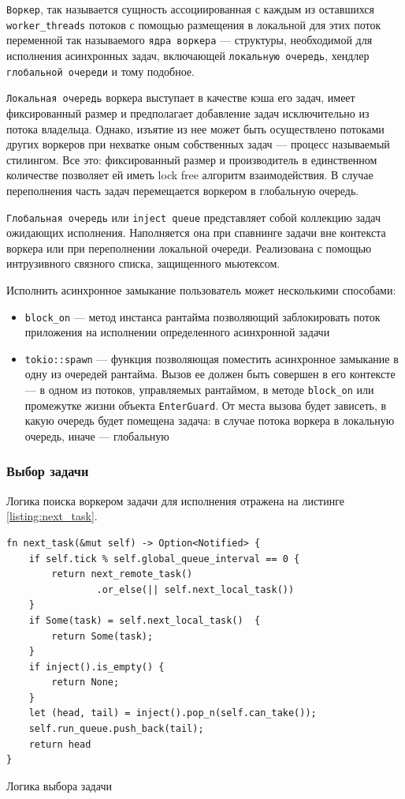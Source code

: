 \verb|Воркер|, так называется сущность ассоциированная с каждым из оставшихся \verb|worker_threads| потоков с помощью размещения в локальной для этих поток переменной так называемого \verb|ядра воркера| --- структуры, необходимой для исполнения асинхронных задач, включающей \verb|локальную очередь|, хендлер \verb|глобальной очереди| и тому подобное.

\verb|Локальная очередь| воркера выступает в качестве кэша его задач, имеет фиксированный размер и предполагает добавление задач исключительно из потока владельца. Однако, изъятие из нее может быть осуществлено потоками других воркеров при нехватке оным собственных задач --- процесс называемый стилингом. Все это: фиксированный размер и производитель в единственном количестве позволяет ей иметь lock free алгоритм взаимодействия. В случае переполнения часть задач перемещается воркером в глобальную очередь.

\verb|Глобальная очередь| или \verb|inject queue| представляет собой коллекцию задач ожидающих исполнения. Наполняется она при спавнинге задачи вне контекста воркера или при переполнении локальной очереди. Реализована с помощью интрузивного связного списка, защищенного мьютексом.

Исполнить асинхронное замыкание пользователь может несколькими способами:

\begin{itemize}
    \item \verb|block_on| --- метод инстанса рантайма позволяющий заблокировать поток приложения на исполнении определенного асинхронной задачи
    \item \verb|tokio::spawn| --- функция позволяющая поместить асинхронное замыкание в одну из очередей рантайма. Вызов ее должен быть совершен в его контексте --- в одном из потоков, управляемых рантаймом, в методе \verb|block_on| или промежутке жизни объекта \verb|EnterGuard|. От места вызова будет зависеть, в какую очередь будет помещена задача: в случае потока воркера в локальную очередь, иначе --- глобальную
\end{itemize}

\subsubsection{Выбор задачи}

Логика поиска воркером задачи для исполнения отражена на листинге \ref{listing:next_task}.

\begin{listing}[H]
    \begin{verbatim}
fn next_task(&mut self) -> Option<Notified> {
    if self.tick % self.global_queue_interval == 0 {
        return next_remote_task()
                .or_else(|| self.next_local_task())
    }
    if Some(task) = self.next_local_task()  {
        return Some(task);
    }
    if inject().is_empty() {
        return None;
    }
    let (head, tail) = inject().pop_n(self.can_take());
    self.run_queue.push_back(tail);
    return head
}
    \end{verbatim}

    \caption{Логика выбора задачи}
    \label{listing:next_task}
\end{listing}

